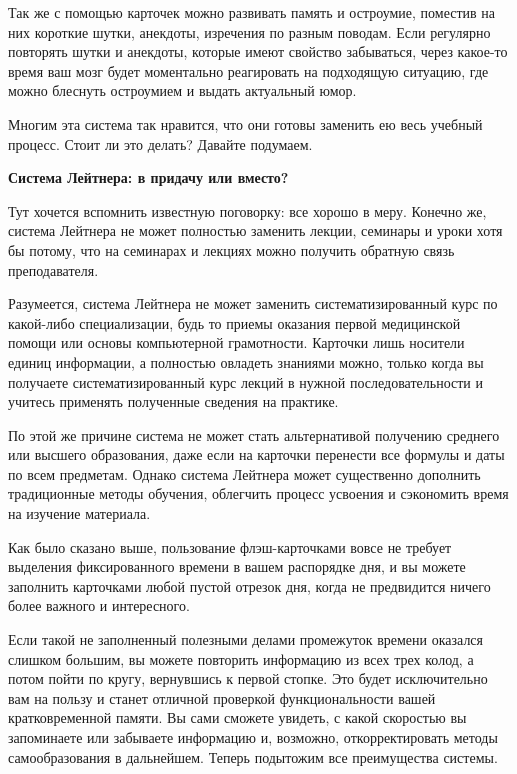Так же с помощью карточек можно развивать память и остроумие, поместив на них короткие шутки, анекдоты, изречения по разным поводам. Если регулярно повторять шутки и анекдоты, которые имеют свойство забываться, через какое-то время ваш мозг будет моментально реагировать на подходящую ситуацию, где можно блеснуть остроумием и выдать актуальный юмор.

Многим эта система так нравится, что они готовы заменить ею весь учебный процесс. Стоит ли это делать? Давайте подумаем.

\textbf{Система Лейтнера: в придачу или вместо?}

Тут хочется вспомнить известную поговорку: все хорошо в меру. Конечно же, система Лейтнера не может полностью заменить лекции, семинары и уроки хотя бы потому, что на семинарах и лекциях можно получить обратную связь преподавателя.

Разумеется, система Лейтнера не может заменить систематизированный курс по какой-либо специализации, будь то приемы оказания первой медицинской помощи или основы компьютерной грамотности. Карточки лишь носители единиц информации, а полностью овладеть знаниями можно, только когда вы получаете систематизированный курс лекций в нужной последовательности и учитесь применять полученные сведения на практике.

По этой же причине система не может стать альтернативой получению среднего или высшего образования, даже если на карточки перенести все формулы и даты по всем предметам. Однако система Лейтнера может существенно дополнить традиционные методы обучения, облегчить процесс усвоения и сэкономить время на изучение материала.

Как было сказано выше, пользование флэш-карточками вовсе не требует выделения фиксированного времени в вашем распорядке дня, и вы можете заполнить карточками любой пустой отрезок дня, когда не предвидится ничего более важного и интересного.

Если такой не заполненный полезными делами промежуток времени оказался слишком большим, вы можете повторить информацию из всех трех колод, а потом пойти по кругу, вернувшись к первой стопке. Это будет исключительно вам на пользу и станет отличной проверкой функциональности вашей кратковременной памяти. Вы сами сможете увидеть, с какой скоростью вы запоминаете или забываете информацию и, возможно, откорректировать методы самообразования в дальнейшем. Теперь подытожим все преимущества системы.

